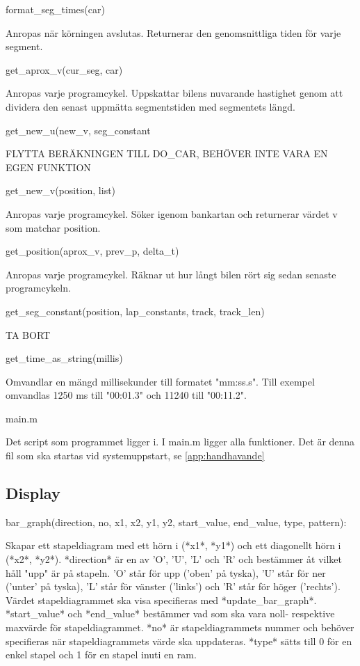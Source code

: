 format\_seg\_times(car)

Anropas när körningen avslutas. Returnerar den genomsnittliga tiden för varje
segment.

get\_aprox\_v(cur\_seg, car)

Anropas varje programcykel. Uppskattar bilens nuvarande hastighet genom att
dividera den senast uppmätta segmentstiden med segmentets längd.

get\_new\_u(new\_v, seg\_constant

FLYTTA BERÄKNINGEN TILL DO\_CAR, BEHÖVER INTE VARA EN EGEN FUNKTION

get\_new\_v(position, list)

Anropas varje programcykel. Söker igenom bankartan och returnerar värdet v som
matchar position.

get\_position(aprox\_v, prev\_p, delta\_t)

Anropas varje programcykel. Räknar ut hur långt bilen rört sig sedan senaste
programcykeln.

get\_seg\_constant(position, lap\_constants, track, track\_len)

TA BORT

get\_time\_as\_string(millis)

Omvandlar en mängd millisekunder till formatet "mm:ss.s". Till exempel omvandlas 1250
ms till "00:01.3" och 11240 till "00:11.2".

main.m

Det script som programmet ligger i. I main.m ligger alla funktioner. 
Det är denna fil som ska startas 
vid systemuppstart, se \ref{app:handhavande}

\subsection{Display}
\label{app:funktioner och filer:display}
bar\_graph(direction, no, x1, x2, y1, y2, start\_value, end\_value, type, pattern):

Skapar ett stapeldiagram med ett hörn i (*x1*, *y1*) och ett diagonellt
hörn i (*x2*, *y2*). *direction* är en av 'O', 'U', 'L' och 'R' och
bestämmer åt vilket håll "upp" är på stapeln. 'O' står för upp ('oben'
på tyska), 'U' står för ner ('unter' på tyska), 'L' står för vänster
('links') och 'R' står för höger ('rechts'). Värdet stapeldiagrammet ska
visa specifieras med *update\_bar\_graph*. *start\_value* och
*end\_value* bestämmer vad som ska vara noll- respektive maxvärde för
stapeldiagrammet. *no* är stapeldiagrammets nummer och behöver
specifieras när stapeldiagrammets värde ska uppdateras. *type* sätts
till 0 för en enkel stapel och 1 för en stapel inuti en ram.

